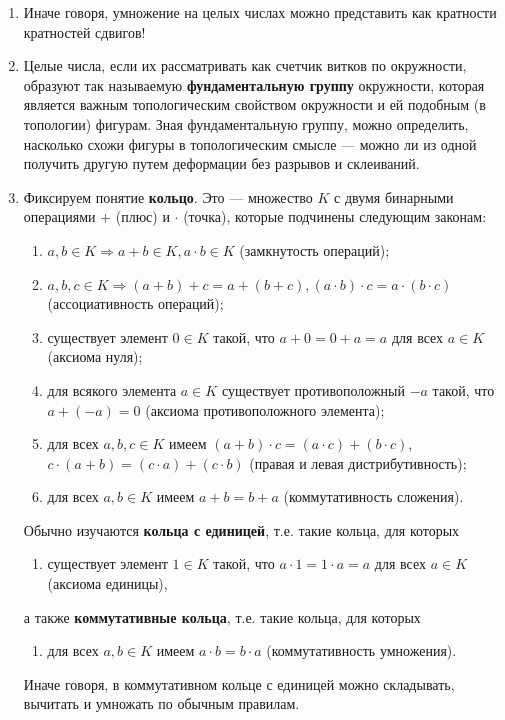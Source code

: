 \begin{enumerate}
\item Иначе говоря, умножение на целых числах можно представить как кратности кратностей сдвигов!
\item Целые числа, если их рассматривать как счетчик витков по окружности, образуют так называемую \textbf{фундаментальную группу} окружности, которая является важным топологическим свойством окружности и ей подобным (в топологии) фигурам. Зная фундаментальную группу, можно определить, насколько схожи фигуры в топологическим смысле --- можно ли из одной получить другую путем деформации без разрывов и склеиваний.
\item Фиксируем понятие \textbf{кольцо}. Это --- множество $K$ с двумя бинарными операциями $+$ (плюс) и $\cdot$ (точка), которые подчинены следующим законам:
\begin{enumerate}[{\bf K}1)]
\item $a,b\in K\Rightarrow a+b\in K, a\cdot b\in K$ (замкнутость операций);
\item $a,b,c\in K\Rightarrow (a+b)+c=a+(b+c), (a\cdot b)\cdot c = a\cdot (b\cdot c)$ (ассоциативность операций);
\item существует элемент $0\in K$ такой, что $a+0=0+a=a$ для всех $a\in K$ (аксиома нуля);
\item для всякого элемента $a\in K$ существует противоположный $-a$ такой, что $a+(-a)=0$ (аксиома противоположного элемента);
\item для всех $a,b,c\in K$ имеем $(a+b)\cdot c=(a\cdot c)+(b\cdot c)$, $c\cdot(a+b)=(c\cdot a)+(c\cdot b)$ (правая и левая дистрибутивность);
\item для всех $a,b\in K$ имеем $a+b=b+a$ (коммутативность сложения).
\end{enumerate}

Обычно изучаются \textbf{кольца с единицей}, т.е. такие кольца, для которых
\begin{enumerate}[resume*]
\item существует элемент $1\in K$ такой, что $a\cdot 1=1\cdot a=a$ для всех $a\in K$ (аксиома единицы),
\end{enumerate}
а также \textbf{коммутативные кольца}, т.е. такие кольца, для которых
\begin{enumerate}[resume*]
\item для всех $a,b\in K$ имеем $a\cdot b=b\cdot a$ (коммутативность умножения).
\end{enumerate}

Иначе говоря, в коммутативном кольце с единицей можно складывать, вычитать и умножать по обычным правилам.
\end{enumerate}
